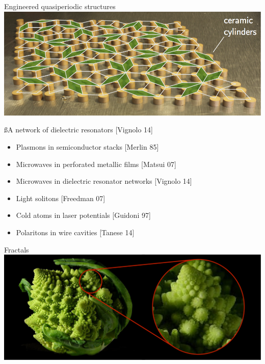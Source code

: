 \begin{frame}{Engineered quasiperiodic structures}
\centering
\includegraphics[width=.5\textwidth]{img/1_intro/dielectric_resonators.png}

{\ss{A network of dielectric resonators [Vignolo \etal{} 14]}}

\begin{itemize}
	\item Plasmons in semiconductor stacks [Merlin \etal{} 85]
	\item Microwaves in perforated metallic films [Matsui \etal{} 07]
	\item Microwaves in dielectric resonator networks [Vignolo \etal{} 14]
	\item Light solitons [Freedman \etal{} 07]
	\item Cold atoms in laser potentials [Guidoni \etal{} 97]
	\item Polaritons in wire cavities [Tanese \etal{} 14]
\end{itemize}
\end{frame}


\begin{frame}{Fractals}
\centering
\includegraphics[width=.5\textwidth]{img/1_intro/Fractal_Broccoli.png}

\end{frame}